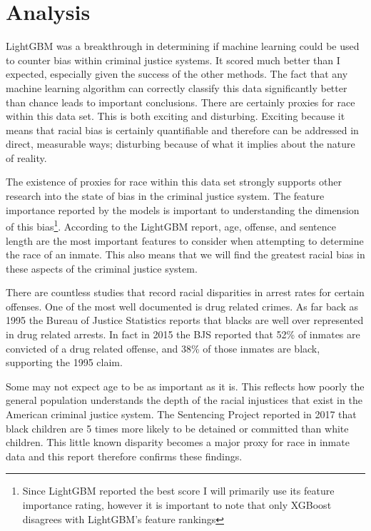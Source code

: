 \documentclass[11pt]{article}
\begin{document}
    \hypertarget{analysis}{%
\section{Analysis}\label{analysis}}
LightGBM was a breakthrough in determining if machine learning could be used to counter bias within criminal justice systems. It scored much better than I expected, especially given the success of the other methods. The fact that any machine learning algorithm can correctly classify this data significantly better than chance leads to important conclusions. There are certainly proxies for race within this data set. This is both exciting and disturbing. Exciting because it means that racial bias is certainly quantifiable and therefore can be addressed in direct, measurable ways; disturbing because of what it implies about the nature of reality.

The existence of proxies for race within this data set strongly supports other research into the state of bias in the criminal justice system. The feature importance reported by the models is important to understanding the dimension of this bias\footnote{Since LightGBM reported the best score I will primarily use its feature importance rating, however it is important to note that only XGBoost disagrees with LightGBM's feature rankings}. According to the LightGBM report, age, offense, and sentence length are the most important features to consider when attempting to determine the race of an inmate. This also means that we will find the greatest racial bias in these aspects of the criminal justice system.

There are countless studies that record racial disparities in arrest rates for certain offenses. One of the most well documented is drug related crimes. As far back as 1995 the Bureau of Justice Statistics reports that blacks are well over represented in drug related arrests\cite{bjs}. In fact in 2015 the BJS reported that 52\% of inmates are convicted of a drug related offense, and 38\% of those inmates are black, supporting the 1995 claim\cite{bjscurr}.

Some may not expect age to be as important as it is. This reflects how poorly the general population understands the depth of the racial injustices that exist in the American criminal justice system. The Sentencing Project reported in 2017 that black children are 5 times more likely to be detained or committed than white children\cite{tsp}. This little known disparity becomes a major proxy for race in inmate data and this report therefore confirms these findings.
\end{document}
